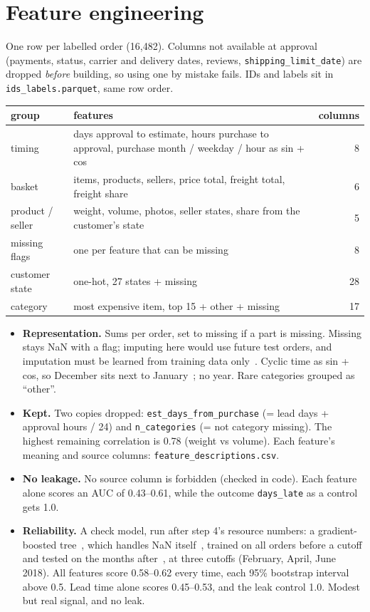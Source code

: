 \documentclass[11pt,a4paper]{article}
\newcommand{\file}[1]{\texttt{#1}}
\begin{document}
\section{Feature engineering}

One row per labelled order (16,482). Columns not available at approval (payments, status, carrier and delivery dates, reviews, \file{shipping\_limit\_date}) are dropped \emph{before} building, so using one by mistake fails. IDs and labels sit in \file{ids\_labels.parquet}, same row order.

\begin{center}\small
\begin{tabular}{lp{9.5cm}r}
\toprule
group & features & columns \\
\midrule
timing & days approval to estimate, hours purchase to approval, purchase month / weekday / hour as sin + cos & 8 \\
basket & items, products, sellers, price total, freight total, freight share & 6 \\
product / seller & weight, volume, photos, seller states, share from the customer's state & 5 \\
missing flags & one per feature that can be missing & 8 \\
customer state & one-hot, 27 states + missing & 28 \\
category & most expensive item, top 15 + other + missing & 17 \\
\bottomrule
\end{tabular}
\end{center}

\begin{itemize}
  \item \textbf{Representation.} Sums per order, set to missing if a part is missing. Missing stays NaN with a flag; imputing here would use future test orders, and imputation must be learned from training data only~\cite{pitfalls}. Cyclic time as sin + cos, so December sits next to January~\cite{cyclic}; no year. Rare categories grouped as ``other''.
  \item \textbf{Kept.} Two copies dropped: \file{est\_days\_from\_purchase} (= lead days + approval hours / 24) and \file{n\_categories} (= not category missing). The highest remaining correlation is 0.78 (weight vs volume). Each feature's meaning and source columns: \file{feature\_descriptions.csv}.
  \item \textbf{No leakage.} No source column is forbidden (checked in code). Each feature alone scores an AUC of 0.43--0.61, while the outcome \file{days\_late} as a control gets 1.0.
  \item \textbf{Reliability.} A check model, run after step 4's resource numbers: a gradient-boosted tree~\cite{sklearn}, which handles NaN itself~\cite{hgb}, trained on all orders before a cutoff and tested on the months after~\cite{tscv}, at three cutoffs (February, April, June 2018). All features score 0.58--0.62 every time, each 95\% bootstrap interval~\cite{efron} above 0.5. Lead time alone scores 0.45--0.53, and the leak control 1.0. Modest but real signal, and no leak.
\end{itemize}
\end{document}
